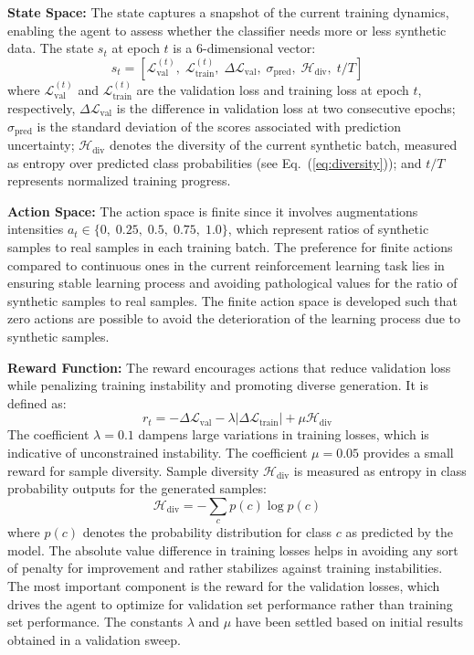\documentclass[conference]{IEEEtran}
\begin{document}
\textbf{State Space:} The state captures a snapshot of the current training dynamics, enabling the agent to assess whether the classifier needs more or less synthetic data. The state $s_t$ at epoch $t$ is a 6-dimensional vector:
\begin{equation}
\label{eq:state}
s_t = [\mathcal{L}_{\text{val}}^{(t)},\; \mathcal{L}_{\text{train}}^{(t)},\; \Delta\mathcal{L}_{\text{val}},\; \sigma_{\text{pred}},\; \mathcal{H}_{\text{div}},\; t/T]
\end{equation}
where $\mathcal{L}^{(t)}_\text{val}$ and $\mathcal{L}^{(t)}_\text{train}$ are the validation loss and training loss at epoch $t$, respectively, $\Delta \mathcal{L}_\text{val}$ is the difference in validation loss at two consecutive epochs; $\sigma_\text{pred}$ is the standard deviation of the scores associated with prediction uncertainty; $\mathcal{H}_\text{div}$ denotes the diversity of the current synthetic batch, measured as entropy over predicted class probabilities (see Eq.~(\ref{eq:diversity})); and $t / T$ represents normalized training progress.


\textbf{Action Space:} The action space is finite since it involves augmentations intensities $a_t \in \{0,\; 0.25,\; 0.5,\; 0.75,\; 1.0\}$, which represent ratios of synthetic samples to real samples in each training batch. The preference for finite actions compared to continuous ones in the current reinforcement learning task lies in ensuring stable learning process and avoiding pathological values for the ratio of synthetic samples to real samples. The finite action space is developed such that zero actions are possible to avoid the deterioration of the learning process due to synthetic samples.

\textbf{Reward Function:} The reward encourages actions that reduce validation loss while penalizing training instability and promoting diverse generation. It is defined as:
\begin{equation}
\label{eq:reward}
r_t = -\Delta \mathcal{L}_{\text{val}} - \lambda |\Delta \mathcal{L}_{\text{train}}| + \mu \mathcal{H}_{\text{div}}
\end{equation}
The coefficient $\lambda = 0.1$ dampens large variations in training losses, which is indicative of unconstrained instability. The coefficient $\mu = 0.05$ provides a small reward for sample diversity. Sample diversity $\mathcal{H}_{\text{div}}$ is measured as entropy in class probability outputs for the generated samples:
\begin{equation}
\label{eq:diversity}
\mathcal{H}_{\text{div}} = - \sum_c p(c) \log p(c)
\end{equation}
where $p(c)$ denotes the probability distribution for class $c$ as predicted by the model. The absolute value difference in training losses helps in avoiding any sort of penalty for improvement and rather stabilizes against training instabilities. The most important component is the reward for the validation losses, which drives the agent to optimize for validation set performance rather than training set performance. The constants $\lambda$ and $\mu$ have been settled based on initial results obtained in a validation sweep.
\end{document}
